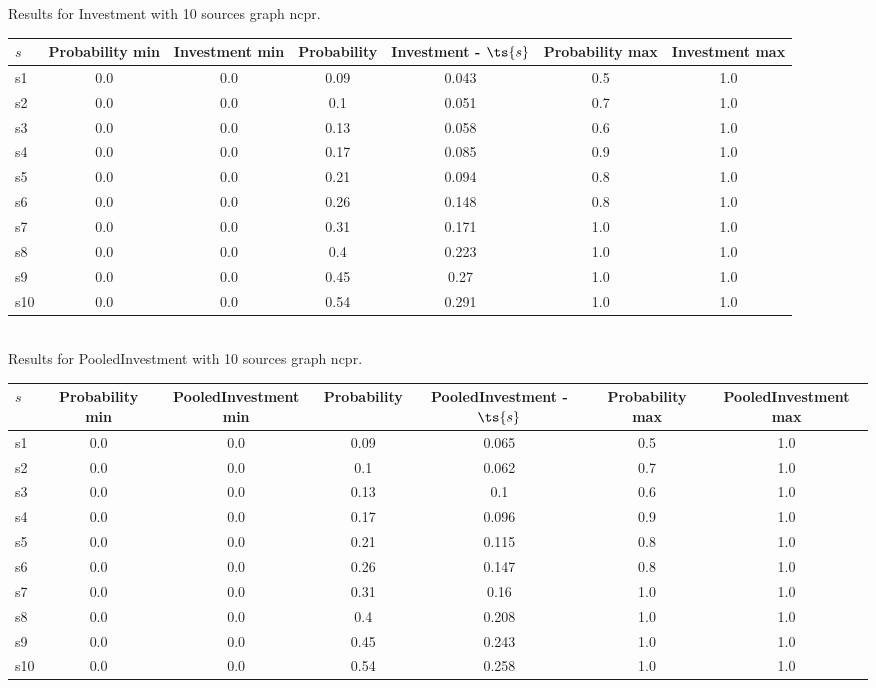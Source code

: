 \documentclass{article}
\begin{document}
\noindent Results for Investment with 10 sources graph ncpr.

\noindent\begin{tabular}{|l|c|c|c|c|c|c|}
\hline
$s$& Probability min & Investment min & Probability & Investment - $\ts{s}$ & Probability max & Investment max\\
\hline
s1 &0.0 & 0.0 & 0.09 & 0.043 & 0.5 & 1.0\\
\hline
s2 &0.0 & 0.0 & 0.1 & 0.051 & 0.7 & 1.0\\
\hline
s3 &0.0 & 0.0 & 0.13 & 0.058 & 0.6 & 1.0\\
\hline
s4 &0.0 & 0.0 & 0.17 & 0.085 & 0.9 & 1.0\\
\hline
s5 &0.0 & 0.0 & 0.21 & 0.094 & 0.8 & 1.0\\
\hline
s6 &0.0 & 0.0 & 0.26 & 0.148 & 0.8 & 1.0\\
\hline
s7 &0.0 & 0.0 & 0.31 & 0.171 & 1.0 & 1.0\\
\hline
s8 &0.0 & 0.0 & 0.4 & 0.223 & 1.0 & 1.0\\
\hline
s9 &0.0 & 0.0 & 0.45 & 0.27 & 1.0 & 1.0\\
\hline
s10 &0.0 & 0.0 & 0.54 & 0.291 & 1.0 & 1.0\\
\hline
\end{tabular}\\

\noindent Results for PooledInvestment with 10 sources graph ncpr.

\noindent\begin{tabular}{|l|c|c|c|c|c|c|}
\hline
$s$& Probability min & PooledInvestment min & Probability & PooledInvestment - $\ts{s}$ & Probability max & PooledInvestment max\\
\hline
s1 &0.0 & 0.0 & 0.09 & 0.065 & 0.5 & 1.0\\
\hline
s2 &0.0 & 0.0 & 0.1 & 0.062 & 0.7 & 1.0\\
\hline
s3 &0.0 & 0.0 & 0.13 & 0.1 & 0.6 & 1.0\\
\hline
s4 &0.0 & 0.0 & 0.17 & 0.096 & 0.9 & 1.0\\
\hline
s5 &0.0 & 0.0 & 0.21 & 0.115 & 0.8 & 1.0\\
\hline
s6 &0.0 & 0.0 & 0.26 & 0.147 & 0.8 & 1.0\\
\hline
s7 &0.0 & 0.0 & 0.31 & 0.16 & 1.0 & 1.0\\
\hline
s8 &0.0 & 0.0 & 0.4 & 0.208 & 1.0 & 1.0\\
\hline
s9 &0.0 & 0.0 & 0.45 & 0.243 & 1.0 & 1.0\\
\hline
s10 &0.0 & 0.0 & 0.54 & 0.258 & 1.0 & 1.0\\
\hline
\end{tabular}\\
\end{document}
